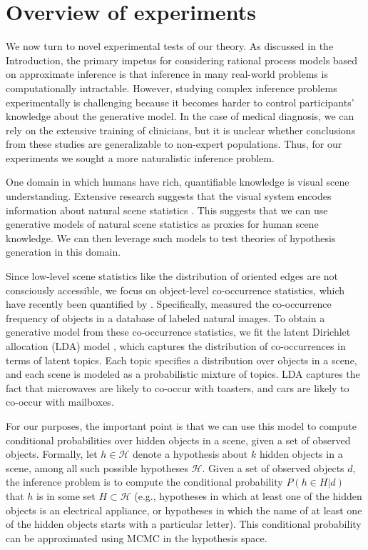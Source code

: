 
\section{Overview of experiments}

We now turn to novel experimental tests of our theory. As discussed in the Introduction, the primary impetus for considering rational process models based on approximate inference is that inference in many real-world problems is computationally intractable. However, studying complex inference problems experimentally is challenging because it becomes harder to control participants' knowledge about the generative model. In the case of medical diagnosis, we can rely on the extensive training of clinicians, but it is unclear whether conclusions from these studies are generalizable to non-expert populations. Thus, for our experiments we sought a more naturalistic inference problem.

One domain in which humans have rich, quantifiable knowledge is visual scene understanding. Extensive research suggests that the visual system encodes information about natural scene statistics \citep{barlow2001exploitation,simoncelli2001natural}. This suggests that we can use generative models of natural scene statistics as proxies for human scene knowledge. We can then leverage such models to test theories of hypothesis generation in this domain.

Since low-level scene statistics like the distribution of oriented edges are not consciously accessible, we focus on object-level co-occurrence statistics, which have recently been quantified by \citet{greene13}. Specifically, \citet{greene13} measured the co-occurrence frequency of objects in a database of labeled natural images. To obtain a generative model from these co-occurrence statistics, we fit the latent Dirichlet allocation (LDA) model \citep{lda}, which captures the distribution of co-occurrences in terms of latent topics. Each topic specifies a distribution over objects in a scene, and each scene is modeled as a probabilistic mixture of topics. LDA captures the fact that microwaves are likely to co-occur with toasters, and cars are likely to co-occur with mailboxes.

For our purposes, the important point is that we can use this model to compute conditional probabilities over hidden objects in a scene, given a set of observed objects. Formally, let $h \in \mathcal{H}$ denote a hypothesis about $k$ hidden objects in a scene, among all such possible hypotheses $\mathcal{H}$. Given a set of observed objects $d$, the inference problem is to compute the conditional probability $P(h \in H|d)$ that $h$ is in some set $H \subset \mathcal{H}$ (e.g., hypotheses in which at least one of the hidden objects is an electrical appliance, or hypotheses in which the name of at least one of the hidden objects starts with a particular letter). This conditional probability can be approximated using MCMC in the hypothesis space.

